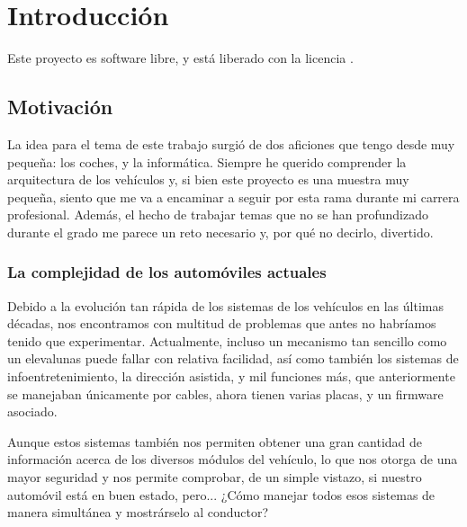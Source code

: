 

\chapter{Introducción}


\noindent{}
Este proyecto es software libre, y está liberado con la licencia \cite{gplv3}.


\section{Motivación}

La idea para el tema de este trabajo surgió de dos aficiones que tengo desde muy pequeña: los coches, y la informática. Siempre he querido comprender la arquitectura de los vehículos y, si bien este proyecto es una muestra muy pequeña, siento que me va a encaminar a seguir por esta rama durante mi carrera profesional. Además, el hecho de trabajar temas que no se han profundizado durante el grado me parece un reto necesario y, por qué no decirlo, divertido.

\subsection{La complejidad de los automóviles actuales}

Debido a la evolución tan rápida de los sistemas de los vehículos en las últimas décadas, nos encontramos con multitud de problemas que antes no habríamos tenido que experimentar. Actualmente, incluso un mecanismo tan sencillo como un elevalunas puede fallar con relativa facilidad, así como también los sistemas de infoentretenimiento, la dirección asistida, y mil funciones más, que anteriormente se manejaban únicamente por cables, ahora tienen varias placas, y un firmware asociado. 

Aunque estos sistemas también nos permiten obtener una gran cantidad de información acerca de los diversos módulos del vehículo, lo que nos otorga de una mayor seguridad y nos permite comprobar, de un simple vistazo, si nuestro automóvil está en buen estado, pero... ¿Cómo manejar todos esos sistemas de manera simultánea y mostrárselo al conductor? 



